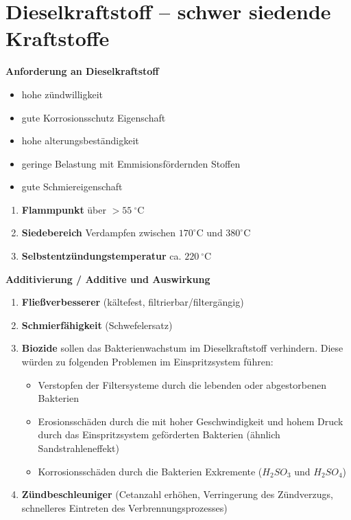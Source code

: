 \section{Dieselkraftstoff -- schwer siedende
Kraftstoffe}\label{dieselkraftstoff-schwer-siedende-kraftstoffe}

\textbf{Anforderung an Dieselkraftstoff}

\begin{itemize}
\item
  hohe zündwilligkeit
\item
  gute Korrosionsschutz Eigenschaft
\item
  hohe alterungsbeständigkeit
\item
  geringe Belastung mit Emmisionsfördernden Stoffen
\item
  gute Schmiereigenschaft
\end{itemize}

\begin{enumerate}
\item
  \textbf{Flammpunkt} über $>55~^\circ\text{C}$
\item
  \textbf{Siedebereich} Verdampfen zwischen
  $170^\circ\text{C} \text{ und } 380^\circ\text{C}$
\item
  \textbf{Selbstentzündungstemperatur} ca. $220~^\circ\text{C}$
\end{enumerate}

\textbf{Additivierung / Additive und Auswirkung}

\begin{enumerate}
\item
  \textbf{Fließverbesserer} (kältefest, filtrierbar/filtergängig)
\item
  \textbf{Schmierfähigkeit} (Schwefelersatz)
\item
  \textbf{Biozide} sollen das Bakterienwachstum im Dieselkraftstoff
  verhindern. Diese würden zu folgenden Problemen im Einspritzsystem
  führen:

  \begin{itemize}
  \item
    Verstopfen der Filtersysteme durch die lebenden oder abgestorbenen
    Bakterien
  \item
    Erosionsschäden durch die mit hoher Geschwindigkeit und hohem Druck
    durch das Einspritzsystem geförderten Bakterien (ähnlich
    Sandstrahleneffekt)
  \item
    Korrosionsschäden durch die Bakterien Exkremente ($H_2SO_3$ und
    $H_2SO_4$)
  \end{itemize}
\item
  \textbf{Zündbeschleuniger} (Cetanzahl erhöhen, Verringerung des
  Zündverzugs, schnelleres Eintreten des Verbrennungsprozesses)
\end{enumerate}

